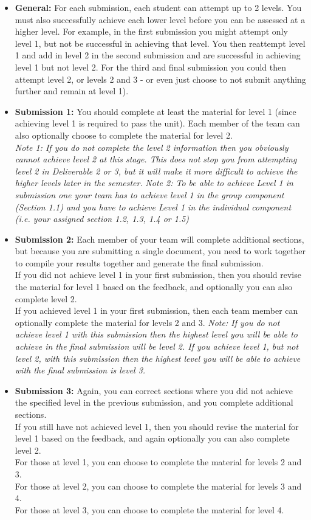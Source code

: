 \documentclass[a4paper, 11pt]{report}
\begin{document}
	\begin{itemize}
		\item \textbf{General:} For each submission, each student can attempt up to 2 levels. You must also successfully achieve each lower level before you can be assessed at a higher level. For example, in the first submission you might attempt only level 1, but not be successful in achieving that level. You then reattempt level 1 and add in level 2 in the second submission and are successful in achieving level 1 but not level 2. For the third and final submission you could then attempt level 2, or levels 2 and 3 - or even just choose to not submit anything further and remain at level 1).
		\item \textbf{Submission 1:} You should complete at least the material for level 1 (since achieving level 1 is required to pass the unit). Each member of the team can also optionally choose to complete the material for level 2.\\
		\textit{Note 1: If you do not complete the level 2 information then you obviously cannot achieve level 2 at this stage. This does not stop you from attempting level 2 in Deliverable 2 or 3, but it will make it more difficult to achieve the higher levels later in the semester.}
		\textit{Note 2: To be able to achieve Level 1 in submission one your team has to achieve level 1 in the group component (Section 1.1) and you have to achieve Level 1 in the individual component (i.e. your assigned section 1.2, 1.3, 1.4 or 1.5)}
		\item \textbf{Submission 2:} Each member of your team will complete additional sections, but because you are submitting a single document, you need to work together to compile your results together and generate the final submission.\\
		If you did not achieve level 1 in your first submission, then you should revise the material for level 1 based on the feedback, and optionally you can also complete level 2.\\
		If you achieved level 1 in your first submission, then each team member can optionally complete the material for levels 2 and 3.
		\textit{Note: If you do not achieve level 1 with this submission then the highest level you will be able to achieve in the final submission will be level 2. If you achieve level 1, but not level 2, with this submission then the highest level you will be able to achieve with the final submission is level 3.}
		\item \textbf{Submission 3:} Again, you can correct sections where you did not achieve the specified level in the previous submission, and you complete additional sections.\\
		If you still have not achieved level 1, then you should revise the material for level 1 based on the feedback, and again optionally you can also complete level 2.\\
		For those at level 1, you can choose to complete the material for levels 2 and 3.\\
		For those at level 2, you can choose to complete the material for levels 3 and 4.\\
		For those at level 3, you can choose to complete the material for level 4.
	\end{itemize}
\end{document}
